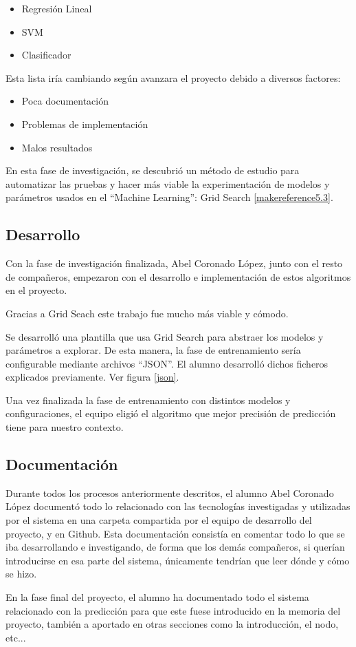 \begin{itemize}
\item Regresión Lineal
\item SVM
\item Clasificador
\end{itemize}

Esta lista iría cambiando según avanzara el proyecto debido a diversos factores:

\begin{itemize}
\item Poca documentación
\item Problemas de implementación
\item Malos resultados
\end{itemize}

En esta fase de investigación, se descubrió un método de estudio para automatizar las pruebas y hacer más viable la experimentación de modelos y parámetros usados en el ``Machine Learning'': Grid Search \ref{makereference5.3}.

\subsection{Desarrollo}
Con la fase de investigación finalizada, Abel Coronado López, junto con el resto de compañeros, empezaron con el desarrollo e implementación de estos algoritmos en el proyecto.

Gracias a Grid Seach este trabajo fue mucho más viable y cómodo.

Se desarrolló una plantilla que usa Grid Search para abstraer los modelos y parámetros a explorar. De esta manera, la fase de entrenamiento sería configurable mediante archivos ``JSON''. El alumno desarrolló dichos ficheros explicados previamente. Ver figura \ref{json}.

Una vez finalizada la fase de entrenamiento con distintos modelos y configuraciones, el equipo eligió el algoritmo que mejor precisión de predicción tiene para nuestro contexto.

\subsection{Documentación}
Durante todos los procesos anteriormente descritos, el alumno Abel Coronado López documentó todo lo relacionado con las tecnologías investigadas y utilizadas por el sistema en una carpeta compartida por el equipo de desarrollo del proyecto, y en Github. Esta documentación consistía en comentar todo lo que se iba desarrollando e investigando, de forma que los demás compañeros, si querían introducirse en esa parte del sistema, únicamente tendrían que leer dónde y cómo se hizo.

En la fase final del proyecto, el alumno ha documentado todo el sistema relacionado con la predicción para que este fuese introducido en la memoria del proyecto, también a aportado en otras secciones como la introducción, el nodo, etc...